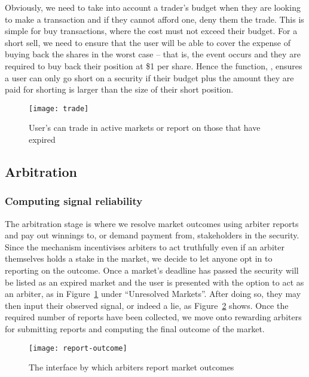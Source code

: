 Obviously, we need to take into account a trader's budget when they are looking
to make a transaction and if they cannot afford one, deny them the trade. This
is simple for buy transactions, where the cost must not exceed their budget.
For a short sell, we need to ensure that the user will be able to cover the
expense of buying back the shares in the worst case -- that is, the event
occurs and they are required to buy back their position at \$1 per share. Hence
the function, , ensures a user can only go short on a
security if their budget plus the amount they are paid for shorting is larger
than the size of their short position.

\begin{figure}[h]
	\centering
	\texttt{[image: trade]}
	\caption{User's can trade in active markets or report on those that have
	expired}
	\label{fig:trade}
\end{figure}

\subsection{Arbitration}

\label{sec:arbitration}

\subsubsection{Computing signal reliability}

The arbitration stage is where we resolve market outcomes using arbiter reports
and pay out winnings to, or demand payment from, stakeholders in the security.
Since the mechanism incentivises arbiters to act truthfully even if an arbiter
themselves holds a stake in the market, we decide to let anyone opt in to
reporting on the outcome. Once a market's deadline has passed the security will
be listed as an expired market and the user is presented with the option to act
as an arbiter, as in Figure~\ref{fig:trade} under ``Unresolved Markets''. After
doing so, they may then input their observed signal, or indeed a lie, as
Figure~\ref{fig:reportOutcome} shows. Once the required number of reports have
been collected, we move onto rewarding arbiters for submitting reports and
computing the final outcome of the market.

\begin{figure}[h]
	\centering
	\texttt{[image: report-outcome]}
	\caption{The interface by which arbiters report market outcomes}
	\label{fig:reportOutcome}
\end{figure}

